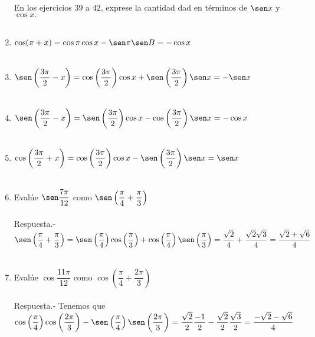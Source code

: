 \begin{enumerate}
En los ejercicios $39$ a $42$, exprese la cantidad dad en términos de $\sen x$ y $\cos x.$\\\\

\item $\cos(\pi + x) = \cos \pi \cos x - \sen \pi \sen B = -\cos x$\\\\

\item $\sen\left(\dfrac{3\pi}{2} - x\right) = \cos\left(\dfrac{3\pi}{2}\right) \cos x + \sen\left(\dfrac{3\pi}{2}\right)\sen x = -\sen x $\\\\

\item $\sen\left(\dfrac{3\pi}{2} - x\right) = \sen\left(\dfrac{3\pi}{2}\right) \cos x - \cos\left(\dfrac{3\pi}{2}\right) \sen x = -\cos x$\\\\

\item $\cos \left(\dfrac{3\pi}{2}+x\right) = \cos\left(\dfrac{3\pi}{2}\right) \cos x - \sen \left(\dfrac{3\pi}{2}\right) \sen x= \sen x$\\\\

\item Evalúe $\sen \dfrac{7\pi}{12}$ como $\sen\left(\dfrac{\pi}{4}+\dfrac{\pi}{3}\right)$\\\\
    Respuesta.-\; $\sen \left(\dfrac{\pi}{4} + \dfrac{\pi}{3}\right) = \sen\left(\dfrac{\pi}{4} \right) \cos\left(\dfrac{\pi}{3}\right) + \cos\left(\dfrac{\pi}{4} \right) \sen\left(\dfrac{\pi}{3}\right) = \dfrac{\sqrt{2}}{4}  +  \dfrac{\sqrt{2}\sqrt{3}}{4} = \dfrac{\sqrt{2}+\sqrt{6}}{4}$\\\\ 

\item Evalúe $\cos \dfrac{11\pi}{12}$ como $\cos\left(\dfrac{\pi}{4} + \dfrac{2\pi}{3}\right)$\\\\
    Respuesta.-\; Tenemos que $\cos \left(\dfrac{\pi}{4}\right) \cos \left(\dfrac{2\pi}{3} \right) - \sen \left( \dfrac{\pi}{4} \right) \sen \left( \dfrac{2\pi}{3} \right) = \dfrac{\sqrt{2}}{2} \dfrac{-1}{2} - \dfrac{\sqrt{2}}{2} \dfrac{\sqrt{3}}{2} = \dfrac{-\sqrt{2} - \sqrt{6}}{4}$\\\\


\end{enumerate}
